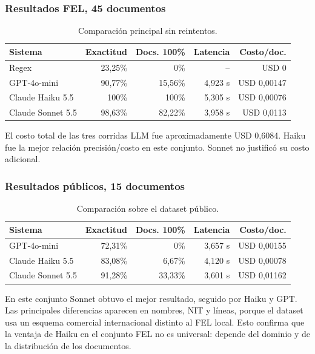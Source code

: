 \documentclass[11pt,a4paper]{article}
\begin{document}
\subsubsection{Resultados FEL, 45 documentos}
\begin{table}[ht]
\centering
\caption{Comparación principal sin reintentos.}
\begin{tabular}{lrrrr}
\toprule
Sistema & Exactitud & Docs. 100\% & Latencia & Costo/doc. \\
\midrule
Regex & 23,25\% & 0\% & -- & USD 0 \\
GPT-4o-mini & 90,77\% & 15,56\% & 4,923 s & USD 0,00147 \\
Claude Haiku 5.5 & 100\% & 100\% & 5,305 s & USD 0,00076 \\
Claude Sonnet 5.5 & 98,63\% & 82,22\% & 3,958 s & USD 0,0113 \\
\bottomrule
\end{tabular}
\end{table}

El costo total de las tres corridas LLM fue aproximadamente USD 0,6084. Haiku fue la mejor relación precisión/costo en este conjunto. Sonnet no justificó su costo adicional.

\subsubsection{Resultados públicos, 15 documentos}
\begin{table}[ht]
\centering
\caption{Comparación sobre el dataset público.}
\begin{tabular}{lrrrr}
\toprule
Sistema & Exactitud & Docs. 100\% & Latencia & Costo/doc. \\
\midrule
GPT-4o-mini & 72,31\% & 0\% & 3,657 s & USD 0,00155 \\
Claude Haiku 5.5 & 83,08\% & 6,67\% & 4,120 s & USD 0,00078 \\
Claude Sonnet 5.5 & 91,28\% & 33,33\% & 3,601 s & USD 0,01162 \\
\bottomrule
\end{tabular}
\end{table}

En este conjunto Sonnet obtuvo el mejor resultado, seguido por Haiku y GPT. Las principales diferencias aparecen en nombres, NIT y líneas, porque el dataset usa un esquema comercial internacional distinto al FEL local. Esto confirma que la ventaja de Haiku en el conjunto FEL no es universal: depende del dominio y de la distribución de los documentos.
\end{document}
